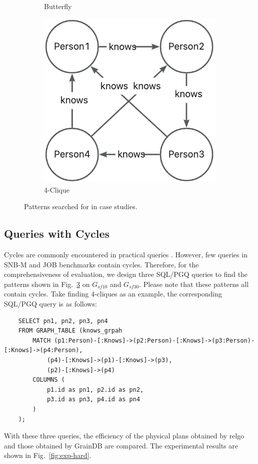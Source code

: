 \begin{figure}[ht]
\begin{subfigure}[b]{.3\linewidth}
        \caption{Butterfly}
        \label{fig:exp-hard-butterfly}
    \end{subfigure}
    \begin{subfigure}[b]{0.3\linewidth}
        \centering
        \includegraphics[width=\linewidth]{./figures/exp/pattern-clique.png}
        \caption{4-Clique}
        \label{fig:exp-hard-clique}
    \end{subfigure}
    \caption{Patterns searched for in case studies.}
    \label{fig:exp-hard-patterns}
\end{figure}

\subsection{Queries with Cycles}
\label{sec:experiment-circle}

Cycles are commonly encountered in practical queries \cite{common-cycle}.
However, few queries in SNB-M and JOB benchmarks contain cycles.
Therefore, for the comprehensiveness of evaluation, we design three SQL/PGQ queries to find the patterns shown in Fig.~\ref{fig:exp-hard-patterns} on $G_{sf10}$ and $G_{sf30}$.
Please note that these patterns all contain cycles.
Take finding 4-cliques as an example, the corresponding SQL/PGQ query is as follows:
\begin{lstlisting}
    SELECT pn1, pn2, pn3, pn4 
    FROM GRAPH_TABLE (knows_grpah
        MATCH (p1:Person)-[:Knows]->(p2:Person)-[:Knows]->(p3:Person)-[:Knows]->(p4:Person),
            (p4)-[:Knows]->(p1)-[:Knows]->(p3),
            (p2)-[:Knows]->(p4)
        COLUMNS (
            p1.id as pn1, p2.id as pn2, 
            p3.id as pn3, p4.id as pn4
        )
    );
\end{lstlisting}
With these three queries, the efficiency of the physical plans obtained by relgo and those obtained by GrainDB are compared.
The experimental results are shown in Fig.~\ref{fig:exp-hard}.


